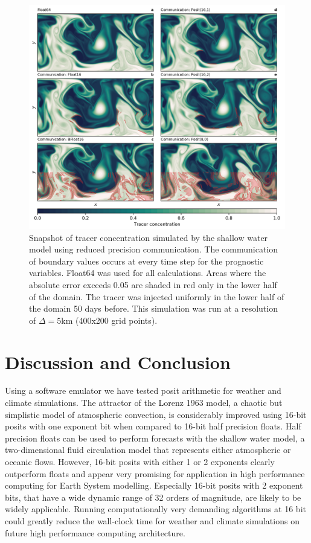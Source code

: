 \documentclass[draft]{agujournal2019}
\begin{document}
\begin{figure}
\includegraphics[width=1\textwidth]{../plots/snapshot_comm.png}
\caption{Snapshot of tracer concentration simulated by the shallow water model using reduced precision communication. The communication of boundary values occurs at every time step for the prognostic variables. Float64 was used for all calculations. Areas where the absolute error exceeds 0.05 are shaded in red only in the lower half of the domain. The tracer was injected uniformly in the lower half of the domain 50 days before. This simulation was run at a resolution of $\Delta = 5$km (400x200 grid points).}
\label{fig:snapshot_comm}
\end{figure}



\section{Discussion and Conclusion}
\label{sec:discuss}

Using a software emulator we have tested posit arithmetic for weather and climate simulations. The attractor of the Lorenz 1963 model, a chaotic but simplistic model of atmospheric convection, is considerably improved using 16-bit posits with one exponent bit when compared to 16-bit half precision floats. Half precision floats can be used to perform forecasts with the shallow water model, a two-dimensional fluid circulation model that represents either atmospheric or oceanic flows. However, 16-bit posits with either 1 or 2 exponents clearly outperform floats and appear very promising for application in high performance computing for Earth System modelling. Especially 16-bit posits with 2 exponent bits, that have a wide dynamic range of 32 orders of magnitude, are likely to be widely applicable. Running computationally very demanding algorithms at 16 bit could greatly reduce the wall-clock time for weather and climate simulations on future high performance computing architecture.
\end{document}
